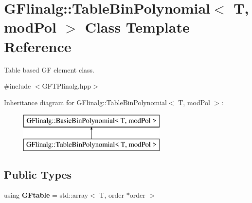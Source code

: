 \hypertarget{class_g_flinalg_1_1_table_bin_polynomial}{}\section{G\+Flinalg\+::Table\+Bin\+Polynomial$<$ T, mod\+Pol $>$ Class Template Reference}
\label{class_g_flinalg_1_1_table_bin_polynomial}


Table based GF element class.  




{\ttfamily \#include $<$G\+F\+T\+Plinalg.\+hpp$>$}

Inheritance diagram for G\+Flinalg\+::Table\+Bin\+Polynomial$<$ T, mod\+Pol $>$\+:\begin{figure}[H]
\begin{center}
\leavevmode
\includegraphics[height=2.000000cm]{class_g_flinalg_1_1_table_bin_polynomial}
\end{center}
\end{figure}
\subsection*{Public Types}
\begin{DoxyCompactItemize}
\item 
\mbox{\label{class_g_flinalg_1_1_table_bin_polynomial_a0602691948df6601ad85dae48aa026e0}} 
using {\bfseries G\+Ftable} = std\+::array$<$ T, order $\ast$order $>$
\end{DoxyCompactItemize}
